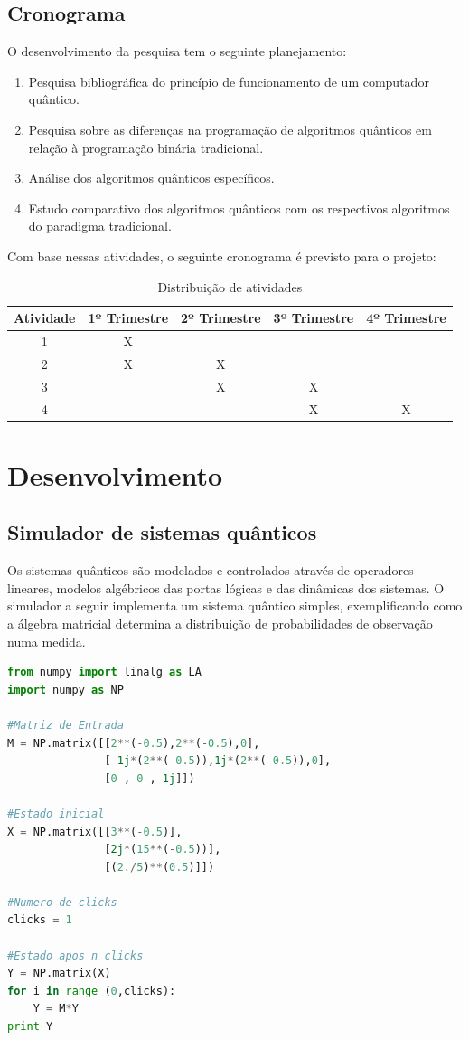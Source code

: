 \documentclass[inci]{imetex}
\begin{document}
\section{Cronograma}
O desenvolvimento da pesquisa tem o seguinte planejamento:
\begin{enumerate}
\item Pesquisa bibliográfica do princípio de funcionamento de um computador quântico.
\item Pesquisa sobre as diferenças na programação de algoritmos quânticos em relação à programação binária tradicional.
\item Análise dos algoritmos quânticos específicos.
\item Estudo comparativo dos algoritmos quânticos com os respectivos algoritmos do paradigma tradicional.
\end{enumerate}
Com base nessas atividades, o seguinte cronograma é previsto para o projeto:
\begin{table}[h]
\centering
\begin{tabular}{|c|c|c|c|c|}
\hline 
Atividade & 1º Trimestre & 2º Trimestre & 3º Trimestre & 4º Trimestre \\ 
\hline 
1 & X &   &   &   \\ 
\hline 
2 & X & X &   &   \\ 
\hline 
3 &   & X & X &   \\ 
\hline 
4 &   &   & X & X \\ 
\hline 
\end{tabular}
\caption{Distribuição de atividades}
\end{table}

\chapter{Desenvolvimento}
\section{Simulador de sistemas quânticos}
Os sistemas quânticos são modelados e controlados através de operadores lineares, modelos algébricos das portas lógicas e das dinâmicas dos sistemas. O simulador a seguir implementa um sistema quântico simples, exemplificando como a álgebra matricial determina a distribuição de probabilidades de observação numa medida.
\begin{lstlisting}[language=Python, caption={Simulador quântico básico}, label=simuladorqb]
from numpy import linalg as LA
import numpy as NP

#Matriz de Entrada
M = NP.matrix([[2**(-0.5),2**(-0.5),0],
               [-1j*(2**(-0.5)),1j*(2**(-0.5)),0],
               [0 , 0 , 1j]])

#Estado inicial
X = NP.matrix([[3**(-0.5)],
               [2j*(15**(-0.5))],
               [(2./5)**(0.5)]])

#Numero de clicks
clicks = 1

#Estado apos n clicks
Y = NP.matrix(X)
for i in range (0,clicks):
    Y = M*Y
print Y
\end{lstlisting}
\end{document}
